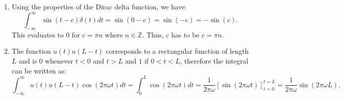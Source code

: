 \begin{enumerate}
  \item Using the properties of the Dirac delta function, we have:
        \[ \int_{-\infty}^{\infty}\sin(t-c)\delta(t)dt=\sin(0-c)=\sin(-c)=-\sin(c). \]
        This evaluates to $0$ for $c=\pi n$ where $n\in\mathbb{Z}$. 
        Thus, $c$ has to be $c=\pi n$.

  \item The function $u(t)u(L-t)$ corresponds to a rectangular function of length $L$ and
        is $0$ whenever $t<0$ and $t>L$ and $1$ if $0<t<L$, therefore the integral can be written as:
        \[ \int_{-\infty}^{\infty}u(t)u(L-t)\cos(2\pi\omega t)dt=\int_{0}^{L}\cos(2\pi\omega t)dt=\frac{1}{2\pi\omega}\left[\sin(2\pi\omega t)\right]_{t=0}^{t=L}=\frac{1}{2\pi\omega}\sin(2\pi\omega L). \]

\end{enumerate}
